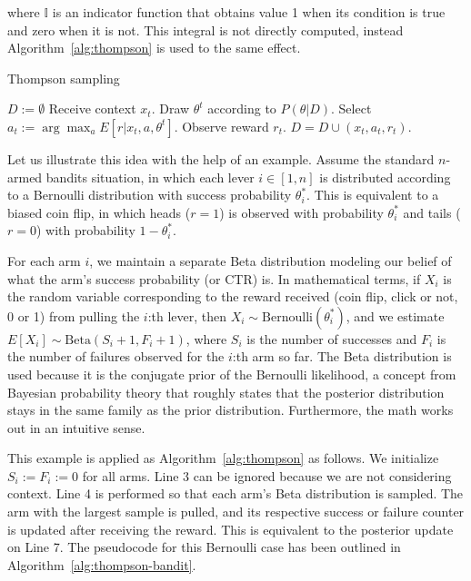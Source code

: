 \documentclass{article} %
\begin{document}
where $\mathbb{I}$ is an indicator function that obtains value 1 when its
condition is true and zero when it is not.  This integral is not directly
computed, instead Algorithm~\ref{alg:thompson} is used to the same effect.

\begin{algorithm}
  \caption{Thompson sampling \cite{chapelle2011empirical}}
  \label{alg:thompson}
  \begin{algorithmic}[1]
    \State $D := \emptyset$
      \State Receive context $x_t$.
      \State Draw $\theta^t$ according to $P(\theta | D)$.
      \State Select $a_t := \arg\max_a E[r | x_t, a, \theta^t]$.
      \State Observe reward $r_t$.
      \State $D = D \cup (x_t, a_t, r_t)$.
    \EndFor
  \end{algorithmic}
\end{algorithm}

Let us illustrate this idea with the help of an example. Assume the standard
$n$-armed bandits situation, in which each lever $i \in [1,n]$ is distributed
according to a Bernoulli distribution with success probability $\theta^*_i$.
This is equivalent to a biased coin flip, in which heads ($r=1$) is observed
with probability $\theta^*_i$ and tails ($r=0$) with probability $1 -
\theta^*_i$.

For each arm $i$, we maintain a separate Beta distribution modeling our belief
of what the arm's success probability (or CTR) is. In mathematical terms, if
$X_i$ is the random variable corresponding to the reward received (coin flip,
click or not, 0 or 1) from pulling the $i$:th lever, then $X_i \sim
\text{Bernoulli}(\theta^*_i)$, and we estimate $E[X_i] \sim \text{Beta}(S_i +
1, F_i + 1)$, where $S_i$ is the number of successes and $F_i$ is the number of
failures observed for the $i$:th arm so far. The Beta distribution is used
because it is the conjugate prior of the Bernoulli likelihood, a concept from
Bayesian probability theory that roughly states that the posterior distribution
stays in the same family as the prior distribution. Furthermore, the math works
out in an intuitive sense.

This example is applied as Algorithm~\ref{alg:thompson} as follows. We
initialize $S_i := F_i := 0$ for all arms. Line 3 can be ignored because we are
not considering context. Line 4 is performed so that each arm's Beta
distribution is sampled.  The arm with the largest sample is pulled, and its
respective success or failure counter is updated after receiving the reward.
This is equivalent to the posterior update on Line 7.  The pseudocode for this
Bernoulli case has been outlined in Algorithm~\ref{alg:thompson-bandit}.
\end{document}
